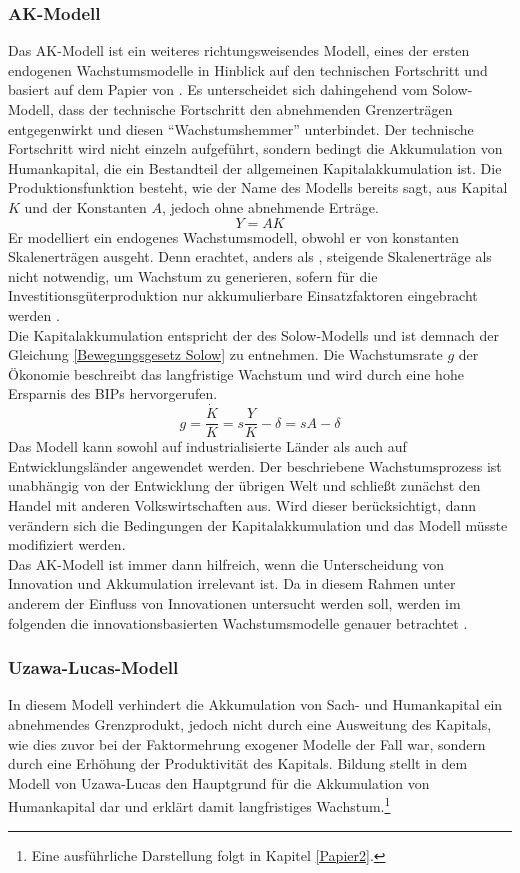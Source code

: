 \subsubsection*{AK-Modell}
%
Das AK-Modell ist ein weiteres richtungsweisendes Modell, eines der er\-sten endogenen Wachstumsmodelle in Hinblick auf den technischen Fortschritt und basiert auf dem Papier von \cite{Rebelo.1991}. Es unterscheidet sich dahingehend vom Solow-Modell, dass der technische Fortschritt den abnehmenden Grenzerträgen entgegenwirkt und diesen "`Wachstumshemmer"' unterbindet.  Der technische Fortschritt wird nicht einzeln aufgeführt, sondern bedingt die Akkumulation von Humankapital, die ein Bestandteil der allgemeinen Kapitalakkumulation ist. Die Produktionsfunktion besteht, wie der Name des Modells bereits sagt, aus Kapital $K$ und der Konstanten $A$, jedoch ohne abnehmende Erträge.
%
	\begin{equation}
		Y=AK
	\end{equation}
%
Er modelliert ein endogenes Wachstumsmodell, obwohl er von konstanten Skalenerträgen ausgeht. Denn \cite{Rebelo.1991} erachtet, anders als \cite{Romer.1990}, steigende Skalenerträge als nicht notwendig, um Wachstum zu generieren, sofern für die Investitionsgüterproduktion nur akkumulierbare Einsatzfaktoren eingebracht werden \cite{Rebelo.1991}. \\
%
Die Kapitalakkumulation entspricht der des Solow-Modells und ist demnach der Gleichung \eqref{Bewegungsgesetz Solow} zu entnehmen. Die Wachstumsrate $g$ der Ökonomie beschreibt das langfristige Wachstum und wird durch eine hohe Ersparnis des BIPs hervorgerufen.
%
	\begin{equation}
		g=\frac{\dot{K}}{K}=s\frac{Y}{K}-\delta=sA-\delta
	\end{equation}
%
Das Modell kann sowohl auf industrialisierte Länder als auch auf Entwicklungsländer angewendet werden. Der beschriebene  Wachstumsprozess ist unabhängig von der Entwicklung der übrigen Welt und schließt zunächst den Handel mit anderen Volkswirtschaften aus. Wird dieser berücksichtigt, dann verändern sich die Bedingungen der Kapitalakkumulation und das Modell müsste modifiziert werden.\\ Das AK-Modell ist immer dann hilfreich, wenn die Unterscheidung von Innovation und Akkumulation irrelevant ist. Da in diesem Rahmen unter anderem der Einfluss von Innovationen untersucht werden soll, werden im folgenden die innovationsbasierten Wachstumsmodelle genauer betrachtet \cite{Aghion.2015}.
%
\subsubsection*{Uzawa-Lucas-Modell} In diesem Modell verhindert die Akkumulation von Sach- und Humankapital ein abnehmendes Grenzprodukt, jedoch nicht durch eine Ausweitung des Kapitals, wie dies zuvor bei der Faktormehrung exogener Modelle der Fall war, sondern durch eine Erhöhung der Produktivität des Kapitals. Bildung stellt in dem Modell von Uzawa-Lucas den Hauptgrund für die Akkumulation von Humankapital dar und erklärt damit langfristiges Wachstum.\footnote{Eine ausführliche Darstellung folgt in Kapitel \ref{Papier2}.}
%
